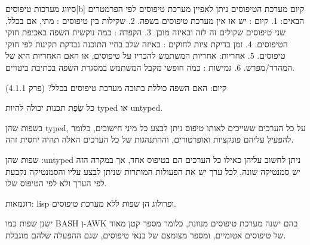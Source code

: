       סיווג מערכות טיפוסים[b]
      קיום מערכת הטיפוסים
      ניתן לאפיין מערכת טיפוסים לפי הפרמטרים הבאים:
      1. קיום : יש או אין מערכת טיפוסים בשפה.
      2. שקילות בין טיפוסים : מתי, אם בכלל, שני טיפוסים שקולים זה לזה ובאיזה מובן.
      3. הקפדה : כמה נוקשית השפה באכיפת חוקי הטיפוסים.
      4. זמן בדיקת ציות לחוקים : באיזה שלב בחיי התוכנה נבדקת תקינות לפי חוקי טיפוסים.
      5. אחריות: אחריות המשתמש להכריז על טיפוסים, או האם האחריות היא של המהדר/מפרש.
      6. גמישות : כמה חופשי מקבל המשתמש במסגרת השפה בכתיבת ביטויים.

      \begin{ציינון}
\item קיום: האם השפה כוללת בתוכה מערכת טיפוסים בכלל? (פרק 4.1.1)
\item כל שְׂפַת תכנות יכולה להיות typed או untyped.
\item בשפות שהן typed, על כל הערכים ששייכים לאותו טיפוס ניתן לבצע כל מיני חישובים, כלומר להפעיל עליהם פונקציות ואופרטורים, וההתנהגות של כל הערכים האלה תהיה יחסית זהה.
\item שפות שהן :untyped ניתן לחשוב עליהן כאילו כל הערכים הם בטיפוס אחד, אך במקרה הזה יש סמנטיקה שונה, לכל ערך יש את הפעולות המותרות שניתן לבצע עליו והסמנטיקה נקבעת לפי הערך ולא לפי הטיפוס שלו.
\item דוגמאות: lisp ופרולוג הן שפות ללא מערכת טיפוסים.
\item ישנן שפות כמו BASH וְ-AWK בהם ישנה מערכת טיפוסים מנוונת, כלומר מספר קטן מאוד של טיפוסים אטומיים, ומספר מצומצם של בנאי טיפוסים, שגם ההפעלה שלהם מוגבלת.
    \end{ציינון}


